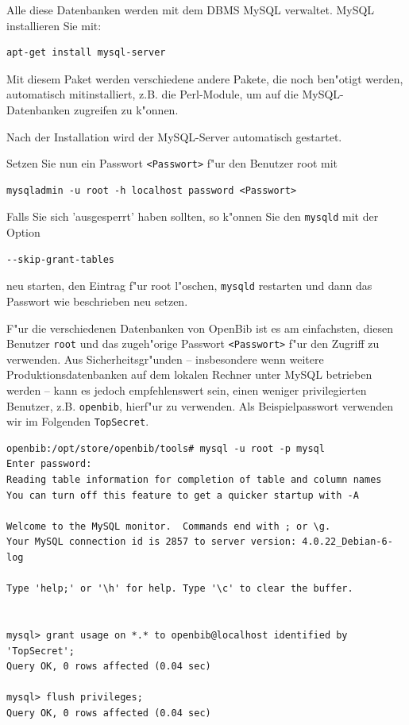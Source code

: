 \documentclass[11pt, twoside, a4paper, BCOR8mm, DIV12, bibtotoc,idxtotoc]{scrbook}
\begin{document}
Alle diese Datenbanken werden mit dem DBMS MySQL verwaltet. MySQL
installieren Sie mit:

\begin{verbatim}
apt-get install mysql-server
\end{verbatim}

Mit diesem Paket werden verschiedene andere Pakete, die noch ben"otigt
werden, automatisch mitinstalliert, z.B. die Perl-Module, um auf die
MySQL-Datenbanken zugreifen zu k"onnen.

Nach der Installation wird der MySQL-Server automatisch gestartet.

Setzen Sie nun ein Passwort \texttt{<Passwort>} f"ur den Benutzer root mit

\begin{verbatim}
mysqladmin -u root -h localhost password <Passwort>
\end{verbatim}

Falls Sie sich 'ausgesperrt' haben sollten, so k"onnen Sie den
\texttt{mysqld} mit der Option
\begin{verbatim}
--skip-grant-tables
\end{verbatim}
neu starten, den Eintrag f"ur root l"oschen, \texttt{mysqld} restarten
und dann das Passwort wie beschrieben neu setzen.

F"ur die verschiedenen Datenbanken von OpenBib ist es am einfachsten,
diesen Benutzer \texttt{root} und das zugeh"orige Passwort
\texttt{<Passwort>} f"ur den Zugriff zu verwenden. Aus
Sicherheitsgr"unden -- insbesondere wenn weitere
Produktionsdatenbanken auf dem lokalen Rechner unter MySQL betrieben
werden -- kann es jedoch empfehlenswert sein, einen weniger
privilegierten Benutzer, z.B. \texttt{openbib}, hierf"ur zu verwenden.
Als Beispielpasswort verwenden wir im Folgenden \texttt{TopSecret}.


\begin{verbatim}
openbib:/opt/store/openbib/tools# mysql -u root -p mysql
Enter password:
Reading table information for completion of table and column names
You can turn off this feature to get a quicker startup with -A

Welcome to the MySQL monitor.  Commands end with ; or \g.
Your MySQL connection id is 2857 to server version: 4.0.22_Debian-6-log

Type 'help;' or '\h' for help. Type '\c' to clear the buffer.


mysql> grant usage on *.* to openbib@localhost identified by 'TopSecret';
Query OK, 0 rows affected (0.04 sec)

mysql> flush privileges;
Query OK, 0 rows affected (0.04 sec)
\end{verbatim}
\end{document}
